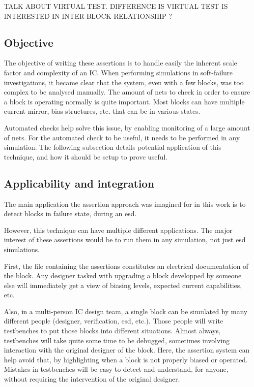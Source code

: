 TALK ABOUT VIRTUAL TEST. DIFFERENCE IS VIRTUAL TEST IS INTERESTED IN INTER-BLOCK RELATIONSHIP ?

\subsection{Objective}

The objective of writing these assertions is to handle easily the inherent scale factor and complexity of an IC.
When performing simulations in soft-failure investigations, it became clear that the system, even with a few blocks,
was too complex to be analysed manually.
The amount of nets to check in order to ensure a block is operating normally is quite important.
Most blocks can have multiple current mirror, bias structures, etc. that can be in various states.

Automated checks help solve this issue, by enabling monitoring of a large amount of nets.
For the automated check to be useful, it needs to be performed in any simulation.
The following subsection details potential application of this technique, and how it should be setup to prove useful.

\subsection{Applicability and integration}

The main application the assertion approach was imagined for in this work is to detect blocks in failure state,
during an \gls{esd}.

However, this technique can have multiple different applications.
The major interest of these assertions would be to run them in any simulation, not just \gls{esd} simulations.

First, the file containing the assertions constitutes an electrical documentation of the block.
Any designer tasked with upgrading a block developped by someone else will immediately get a view of biasing levels,
expected current capabilities, etc.

Also, in a multi-person IC design team, a single block can be simulated by many different people (designer, verification, esd, etc.).
Those people will write testbenches to put those blocks into different situations.
Almost always, testbenches will take quite some time to be debugged, sometimes involving interaction with the original designer of the block.
Here, the assertion system can help avoid that, by highlighting when a block is not properly biased or operated.
Mistakes in testbenches will be easy to detect and understand, for anyone, without requiring the intervention of the original designer.


